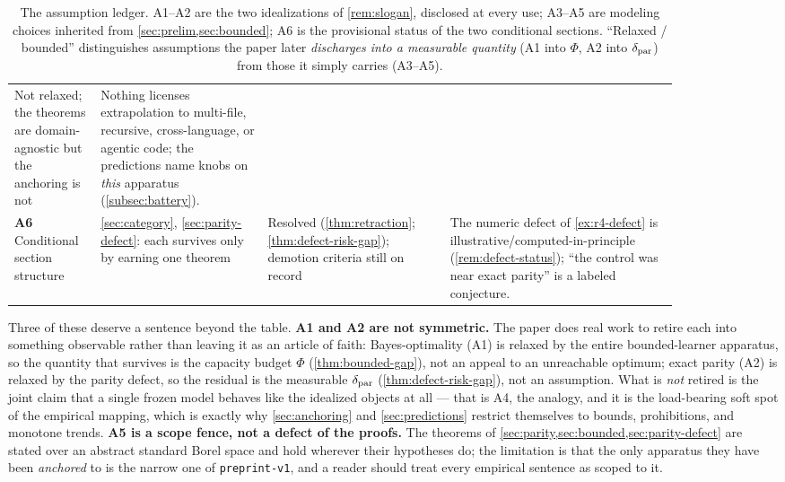 \begin{table}[t]
\begin{tabular}{@{}>{\raggedright\arraybackslash}p{0.10\linewidth}>{\raggedright\arraybackslash}p{0.22\linewidth}>{\raggedright\arraybackslash}p{0.24\linewidth}>{\raggedright\arraybackslash}p{0.30\linewidth}@{}}
  Not relaxed; the theorems are domain-agnostic but the anchoring is not &
  Nothing licenses extrapolation to multi-file, recursive, cross-language, or agentic code; the predictions name knobs on \emph{this} apparatus (\cref{subsec:battery}). \\
\textbf{A6} Conditional section structure &
  \cref{sec:category}, \cref{sec:parity-defect}: each survives only by earning one theorem &
  Resolved (\cref{thm:retraction}; \cref{thm:defect-risk-gap}); demotion criteria still on record &
  The numeric defect of \cref{ex:r4-defect} is illustrative/computed-in-principle (\cref{rem:defect-status}); ``the control was near exact parity'' is a labeled conjecture. \\
\bottomrule
\end{tabular}
\caption{The assumption ledger. A1--A2 are the two idealizations of
\cref{rem:slogan}, disclosed at every use; A3--A5 are modeling choices inherited
from \cref{sec:prelim,sec:bounded}; A6 is the provisional status of the two
conditional sections. ``Relaxed / bounded'' distinguishes assumptions the paper
later \emph{discharges into a measurable quantity} (A1 into $\Phi$, A2 into
$\delta_{\mathrm{par}}$) from those it simply carries (A3--A5).}
\label{tab:idealization-ledger}
\end{table}

Three of these deserve a sentence beyond the table. \textbf{A1 and A2 are not
symmetric.} The paper does real work to retire each into something observable
rather than leaving it as an article of faith: Bayes-optimality (A1) is relaxed
by the entire bounded-learner apparatus, so the quantity that survives is the
capacity budget $\Phi$ (\cref{thm:bounded-gap}), not an appeal to an unreachable
optimum; exact parity (A2) is relaxed by the parity defect, so the residual is
the measurable $\delta_{\mathrm{par}}$ (\cref{thm:defect-risk-gap}), not an assumption.
What is \emph{not} retired is the joint claim that a single frozen model behaves
like the idealized objects at all --- that is A4, the analogy, and it is the
load-bearing soft spot of the empirical mapping, which is exactly why
\cref{sec:anchoring} and \cref{sec:predictions} restrict themselves to bounds,
prohibitions, and monotone trends. \textbf{A5 is a scope fence, not a defect of
the proofs.} The theorems of \cref{sec:parity,sec:bounded,sec:parity-defect} are
stated over an abstract standard Borel space and hold wherever their hypotheses
do; the limitation is that the only apparatus they have been \emph{anchored} to
is the narrow one of \texttt{preprint-v1}, and a reader should treat every
empirical sentence as scoped to it.

